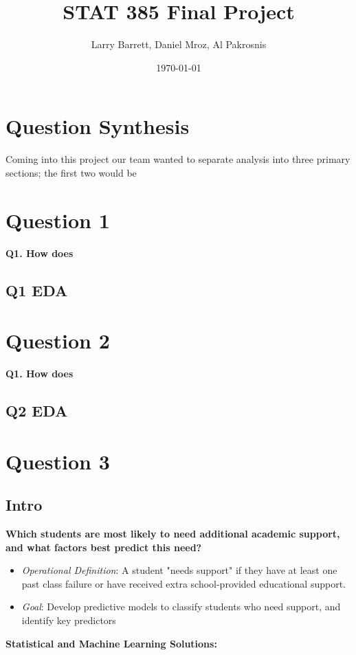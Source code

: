 \documentclass[12pt]{article}
\title{STAT 385 Final Project}
\author{Larry Barrett, Daniel Mroz, Al Pakrosnis}
\date{\today}
\begin{document}
\maketitle

\section{Question Synthesis}
Coming into this project our team wanted to separate analysis into three primary sections; the first two would be 

\section{Question 1}
\textbf{Q1. How does}
\subsection{Q1 EDA}

\newpage 

\section{Question 2}
\textbf{Q1. How does}
\subsection{Q2 EDA}

\newpage

\section{Question 3}
\subsection{Intro}
\textbf{Which students are most likely to need additional academic support, and what factors best predict this need?}

\begin{itemize}
    \item \textit{Operational Definition}: A student "needs support" if they have at least one past class failure or have received extra school-provided educational support.
    \item \textit{Goal}: Develop predictive models to classify students who need support, and identify key predictors
\end{itemize}

\textbf{Statistical and Machine Learning Solutions:}
\end{document}
